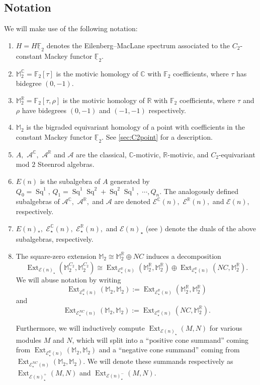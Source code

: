 \documentclass{amsart}
\theoremstyle{plain}
\numberwithin{equation}{section}
\numberwithin{figure}{section}
\DeclareMathOperator{\Ext}{Ext}
\DeclareMathOperator{\Sq}{Sq}
\newcommand{\mC}{{\mathbb C}}
\newcommand{\mF}{{\mathbb F}}
\newcommand{\mM}{{\mathbb M}}
\newcommand{\mR}{{\mathbb R}}
\newcommand{\cA}{{\mathcal A}}
\newcommand{\cE}{{\mathcal E}}
\newcommand{\umF}{\underline{\mF}}
\newcommand{\0}{\langle 0 \rangle }
\begin{document}
\subsection{Notation}
We will make use of the following notation:
\begin{enumerate}
    \item $H = H \umF_2$ denotes the Eilenberg--MacLane spectrum associated to the $C_2$-constant Mackey functor $\umF_2.$
    \item $\mM_2^\mC = \mF_2[\tau]$ is the motivic homology of $\mC$ with $\mF_2$ coefficients, where $\tau$ has bidegree $(0,-1).$
    \item $\mM_2^\mR = \mF_2 [\tau, \rho]$ is the motivic homology of $\mR$ with $\mF_2$ coefficients, where $\tau$ and $\rho$ have bidegrees $(0,-1)$ and $(-1,-1)$ respectively. 
    \item $\mM_2$ is the bigraded equivariant homology of a point with coefficients in the constant Mackey functor $\umF_2.$ See \cref{sec:C2point} for a description.
    \item $A,$ $\cA^\mC,$ $\cA^\mR$ and $\cA$ are the classical, $\mC$-motivic, $\mR$-motivic, and $C_2$-equivariant mod $2$ Steenrod algebras. 
    \item $E(n)$ is the subalgebra of $A$ generated by $Q_0 = \Sq^1, \, Q_1=\Sq^1 \Sq^2 + \Sq^2 \Sq^1,$ $\cdots, Q_n.$ The analogously defined subalgebras of $\cA^\mC,$ $\cA^\mR,$ and $\cA$ are denoted $\cE^\mC(n),$ $\cE^\mR(n),$ and $\cE(n),$ respectively. 
    \item $E(n)_*,$ $\cE^\mC_\star (n),$ $\cE^\mR_\star (n),$ and $\cE(n)_\star$ (see \cite[Definition~6.5]{Ricka15}) denote the duals of the above subalgebras, respectively.
    \item The square-zero extension $\mM_{2} \cong \mM_{2}^{\mR} \oplus NC$ induces a decomposition \cite[p.8]{GuillouHillIsaksenRavenel2020} 
\[ \Ext_{\cE(n)_\star}(\mM_{2}^{C_2}, \mM_{2}^{C_2}) \cong \Ext_{\cE_{\star}^{\mR}(n)}(\mM_{2}^{\mR}, \mM_{2}^{\mR}) \oplus \Ext_{\cE_{\star}^{\mR}(n)}(NC, \mM_{2}^{\mR})  .\]
We will abuse notation by writing 
\[ \Ext_{\cE_{\star}^{\mR}(n)}(\mM_{2}, \mM_{2}):= \Ext_{\cE_{\star}^{\mR}(n)}(\mM_{2}^{\mR}, \mM_{2}^{\mR}) \]
and 
\[ \Ext_{\cE_{\star}^{NC}(n)}(\mM_{2}, \mM_{2}):= \Ext_{\cE_{\star}^{\mR}(n)}(NC, \mM_{2}^{\mR}) .\]

Furthermore, we will inductively compute $\Ext_{\cE(n)_\star}(M, N)$ for various modules $M$ and $N$, which will split into a ``positive cone summand'' coming from \newline $\Ext_{\cE_\star^{\mR}(n)}(\mM_{2}, \mM_{2})$ and a ``negative cone summand'' coming from \newline $\Ext_{\cE^{NC}_\star(n)}(\mM_{2}, \mM_{2})$. We will denote these summands respectively as \newline $\Ext_{\cE(n)_{\star}^+}(M, N)$ and $\Ext_{\cE(n)_{\star}^-}(M, N)$.


\end{enumerate}
\end{document}
